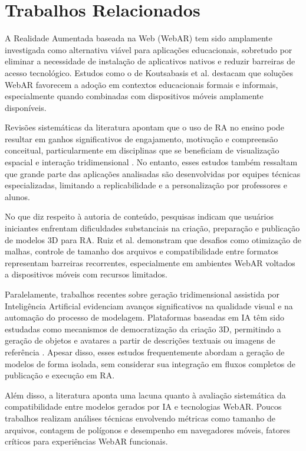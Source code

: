 \documentclass[conference]{IEEEtran}
\begin{document}
\section{Trabalhos Relacionados}

A Realidade Aumentada baseada na Web (WebAR) tem sido amplamente investigada como alternativa viável para aplicações educacionais, sobretudo por eliminar a necessidade de instalação de aplicativos nativos e reduzir barreiras de acesso tecnológico. Estudos como o de Koutsabasis et al. \cite{koutsabasis2021webar} destacam que soluções WebAR favorecem a adoção em contextos educacionais formais e informais, especialmente quando combinadas com dispositivos móveis amplamente disponíveis.

Revisões sistemáticas da literatura apontam que o uso de RA no ensino pode resultar em ganhos significativos de engajamento, motivação e compreensão conceitual, particularmente em disciplinas que se beneficiam de visualização espacial e interação tridimensional \cite{fonnet2021review, munoz2021education}. No entanto, esses estudos também ressaltam que grande parte das aplicações analisadas são desenvolvidas por equipes técnicas especializadas, limitando a replicabilidade e a personalização por professores e alunos.

No que diz respeito à autoria de conteúdo, pesquisas indicam que usuários iniciantes enfrentam dificuldades substanciais na criação, preparação e publicação de modelos 3D para RA. Ruiz et al. \cite{ruiz2020arbeginner} demonstram que desafios como otimização de malhas, controle de tamanho dos arquivos e compatibilidade entre formatos representam barreiras recorrentes, especialmente em ambientes WebAR voltados a dispositivos móveis com recursos limitados.

Paralelamente, trabalhos recentes sobre geração tridimensional assistida por Inteligência Artificial evidenciam avanços significativos na qualidade visual e na automação do processo de modelagem. Plataformas baseadas em IA têm sido estudadas como mecanismos de democratização da criação 3D, permitindo a geração de objetos e avatares a partir de descrições textuais ou imagens de referência \cite{mesh2023}. Apesar disso, esses estudos frequentemente abordam a geração de modelos de forma isolada, sem considerar sua integração em fluxos completos de publicação e execução em RA.

Além disso, a literatura aponta uma lacuna quanto à avaliação sistemática da compatibilidade entre modelos gerados por IA e tecnologias WebAR. Poucos trabalhos realizam análises técnicas envolvendo métricas como tamanho de arquivos, contagem de polígonos e desempenho em navegadores móveis, fatores críticos para experiências WebAR funcionais.
\end{document}
